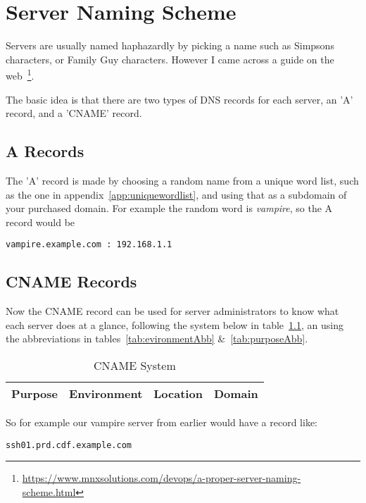 \chapter{Server Naming Scheme}
\label{chp:serverNamingScheme}

Servers are usually named haphazardly by picking a name such as Simpsons characters, or Family Guy characters.  However I came across a guide on the web~\footnote{\url{https://www.mnxsolutions.com/devops/a-proper-server-naming-scheme.html}}.

The basic idea is that there are two types of DNS records for each server, an 'A' record, and a 'CNAME' record.

\section{A Records}

The 'A' record is made by choosing a random name from a unique word list, such as the one in appendix~\ref{app:uniquewordlist}, and using that as a subdomain of your purchased domain.  For example the random word is \textit{vampire}, so the A record would be

\begin{verbatim}
vampire.example.com : 192.168.1.1
\end{verbatim}

\section{CNAME Records}

Now the CNAME record can be used for server administrators to know what each server does at a glance, following the system below in table~\ref{tab:CNAMEsystem}, an using the abbreviations in tables~\ref{tab:evironmentAbb} \&~\ref{tab:purposeAbb}.

\begin{table}[htb]
\centering
\begin{tabular}{|c|c|c|c|}
\hline
\rowcolor{Gray}
Purpose & Environment & Location & Domain\\
\hline
\end{tabular}
\caption{CNAME System}
\label{tab:CNAMEsystem}
\end{table}

So for example our vampire server from earlier would have a record like:

\begin{verbatim}
ssh01.prd.cdf.example.com
\end{verbatim}


